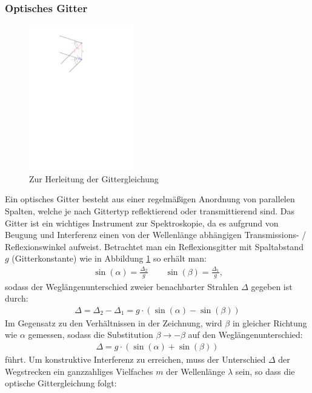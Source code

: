 \documentclass[11pt, a4paper]{article}
\numberwithin{equation}{section}
\begin{document}
\subsubsection{Optisches Gitter}
\begin{figure}
	\centering
	\includegraphics[width=0.4\textwidth]{./figures/herleitung_gitter.pdf}
	\caption{Zur Herleitung der Gittergleichung}
	\label{fig:gitter}
\end{figure}
Ein optisches Gitter besteht aus einer regelmäßigen Anordnung von parallelen Spalten, welche je nach Gittertyp reflektierend oder transmittierend sind.
Das Gitter ist ein wichtiges Instrument zur Spektroskopie, da es aufgrund von Beugung und Interferenz einen von der Wellenlänge abhängigen Transmissions- / Reflexionswinkel aufweist.
Betrachtet man ein Reflexionsgitter mit Spaltabstand $g$ (Gitterkonstante) wie in Abbildung \ref{fig:gitter} so erhält man:
\begin{align*}
	\sin(\alpha) = \frac{\Delta_2}{g} \qquad \sin(\beta) = \frac{\Delta_1}{g} \text{,}
\end{align*}
sodass der Weglängenunterschied zweier benachbarter Strahlen $\Delta$ gegeben ist durch:
\begin{align*}
	\Delta = \Delta_2 - \Delta_1 = g \cdot \left(\sin(\alpha) - \sin(\beta) \right)
\end{align*}
Im Gegensatz zu den Verhältnissen in der Zeichnung, wird $\beta$ in gleicher Richtung wie $\alpha$ gemessen, sodass die Substitution $\beta \rightarrow -\beta$ auf den Weglängenunterschied:
\begin{align*}
	\Delta = g \cdot \left(\sin(\alpha) + \sin(\beta) \right)
\end{align*}
führt.
Um konstruktive Interferenz zu erreichen, muss der Unterschied $\Delta$ der Wegstrecken ein ganzzahliges Vielfaches $m$ der Wellenlänge $\lambda$ sein, so dass die optische Gittergleichung folgt:
\end{document}
